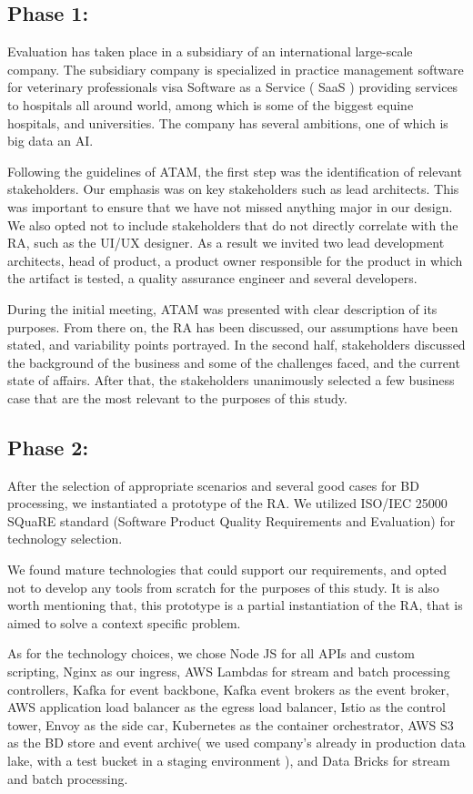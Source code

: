 \documentclass[runningheads]{llncs}
\begin{document}
\subsection{Phase 1:}
Evaluation has taken place in a subsidiary of an international large-scale company. The subsidiary company is specialized in practice management software for veterinary professionals visa Software as a Service ( SaaS ) providing services to hospitals all around world, among which is some of the biggest equine hospitals, and universities. The company has several ambitions, one of which is big data an AI. 

Following the guidelines of ATAM, the first step was the identification of relevant stakeholders. Our emphasis was on key stakeholders such as lead architects. This was important to ensure that we have not missed anything major in our design. We also opted not to include stakeholders that do not directly correlate with the RA, such as the UI/UX designer. As a result we invited two lead development architects, head of product, a product owner responsible for the product in which the artifact is tested, a quality assurance engineer and several developers. 

During the initial meeting, ATAM was presented with clear description of its purposes. From there on, the RA has been discussed, our assumptions have been stated, and variability points portrayed. In the second half, stakeholders discussed the background of the business and some of the challenges faced, and the current state of affairs. After that, the stakeholders unanimously selected a few business case that are the most relevant to the purposes of this study. 

\subsection{Phase 2:}

After the selection of appropriate scenarios and several good cases for BD processing, we instantiated a prototype of the RA. We utilized ISO/IEC 25000 SQuaRE standard (Software Product Quality Requirements
and Evaluation) \cite{ISO25000} for technology selection. 

We found mature technologies that could support our requirements, and opted not to develop any tools from scratch for the purposes of this study. It is also worth mentioning that, this prototype is a partial instantiation of the RA, that is aimed to solve a context specific problem. 

As for the technology choices, we chose Node JS for all APIs and custom scripting, Nginx as our ingress, AWS Lambdas for stream and batch processing controllers, Kafka for event backbone, Kafka event brokers as the event broker, AWS application load balancer as the egress load balancer, Istio as the control tower, Envoy as the side car, Kubernetes as the container orchestrator, AWS S3 as the BD store and event archive( we used company's already in production data lake, with a test bucket in a staging environment ), and Data Bricks for stream and batch processing. 
\end{document}

